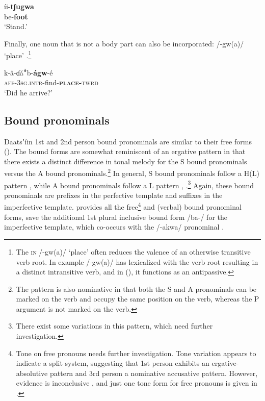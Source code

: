 \documentclass[output=paper]{langsci/langscibook}
\begin{document}
\ea\label{ex:ahlandc:14}
\gll
\'{i}i-\textbf{tʃugwa} \\
be{}-\textbf{foot} \\
\glt
‘Stand.’
\z

Finally, one noun that is not a body part can also be incorporated: /-gw(a)/ ‘place' .\footnote{The \textsc{in }/-gw(a)/ ‘place’ often reduces the valence of an otherwise transitive verb root. In example  /-gw(a)/ has lexicalized with the verb root resulting in a distinct intransitive verb, and in  (), it functions as an antipassive.}

\ea\label{ex:ahlandc:15}
\gll
k-\^{a}-ɗ\'{a}\textsf{ꜜ}b-\textbf{\'{a}gw}{}-\'{e} \\
\textsc{aff-3sg.intr}-find-\textbf{\textsc{place-}}\textsc{twrd} \\
\glt
‘Did he arrive?’
\z


\subsection{Bound pronominals}\label{sec:ahlandc:4.2}

Daatsʼ\'{i}in 1st and 2nd person bound pronominals are similar to their free forms (). The bound forms are somewhat reminiscent of an ergative pattern in that there exists a distinct difference in tonal melody for the S bound pronominals versus the A bound pronominals.\footnote{The pattern is also nominative in that both the S and A pronominals can be marked on the verb and occupy the same position on the verb, whereas the P argument is not marked on the verb.} In general, S bound pronominals follow a H(L) pattern ,  while A bound pronominals follow a L pattern , .\footnote{There exist some variations in this pattern, which need further investigation.} Again, these bound pronominals are prefixes in the perfective template and suffixes in the imperfective template.  provides all the free\footnote{Tone on free pronouns needs further investigation. Tone variation appears to indicate a split system, suggesting that 1st person exhibits an ergative-absolutive pattern and 3rd person a nominative accusative pattern. However, evidence is inconclusive \citep{Kelly2014}, and just one tone form for free pronouns is given in .} and (verbal) bound pronominal forms, save the additional 1st plural inclusive bound form /ba-/ for the imperfective template, which co-occurs with the /-akwa/ pronominal .
\end{document}
